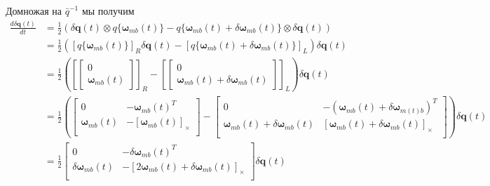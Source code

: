 \documentclass[12pt]{article}
\begin{document}
Домножая на $\bar{q}^{-1}$ мы получим
\begin{equation}
    \begin{aligned}
        \frac{d\delta\pmb{q}(t)}{d t}
         & = \frac{1}{2}\left(\delta\pmb{q}(t) \otimes q\{\pmb{\omega}_{mb}(t)\}-
        q\{\pmb{\omega}_{mb}(t)+\delta \pmb{\omega}_{mb}(t)\}\otimes \delta\pmb{q}(t)\right) \\
         & = \frac{1}{2}([q\{\pmb{\omega}_{mb}(t)\}]_R \delta\pmb{q}(t) -
        [q\{\pmb{\omega}_{mb}(t)+\delta \pmb{\omega}_{mb}(t)\}]_L) \delta\pmb{q}(t)          \\
         & = \frac{1}{2}\left(
        \left[
            \begin{bmatrix}
                0 \\ \pmb{\omega}_{mb}(t)
            \end{bmatrix}
            \right]_R -
        \left[
            \begin{bmatrix}
                0 \\ \pmb{\omega}_{mb}(t)+\delta \pmb{\omega}_{mb}(t)
            \end{bmatrix}
            \right]_L
        \right) \delta\pmb{q}(t)                                                             \\
         & = \frac{1}{2}\left(
        \begin{bmatrix}
                0                    & -\pmb{\omega}_{mb}(t)^T        \\
                \pmb{\omega}_{mb}(t) & -[\pmb{\omega}_{mb}(t)]_\times \\
            \end{bmatrix}
        -
        \begin{bmatrix}
                0                                                & -(\pmb{\omega}_{mb}(t)+\delta \pmb{\omega}_{m(t)b})^T     \\
                \pmb{\omega}_{mb}(t)+\delta \pmb{\omega}_{mb}(t) & [\pmb{\omega}_{mb}(t)+\delta \pmb{\omega}_{mb}(t)]_\times \\
            \end{bmatrix}
        \right) \delta\pmb{q}(t)                                                             \\
         & =
        \frac{1}{2}\begin{bmatrix}
            0                          & -\delta\pmb{\omega}_{mb}(t)^T                              \\
            \delta\pmb{\omega}_{mb}(t) & -[2\pmb{\omega}_{mb}(t)+\delta\pmb{\omega}_{mb}(t)]_\times \\
        \end{bmatrix}
        \delta\pmb{q}(t)                                                                     \\
    \end{aligned}
\end{equation}
\end{document}
